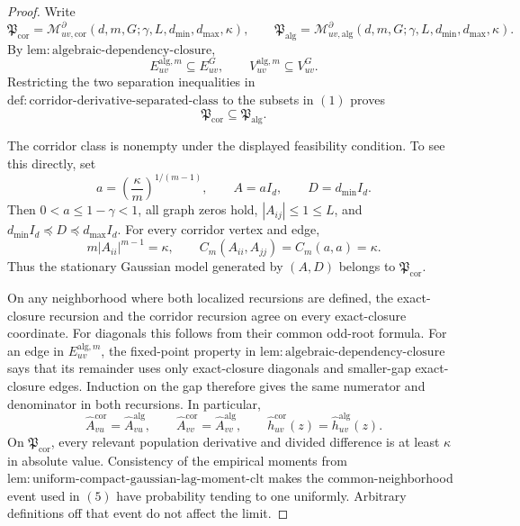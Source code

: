 \documentclass{article}
\begin{document}
\begin{proof}
Write
\[
 \mathfrak P_{\mathrm{cor}}
 =\mathcal M_{uv,\mathrm{cor}}^{\partial}
 (d,m,G;\gamma,L,d_{\min},d_{\max},\kappa),
 \qquad
 \mathfrak P_{\mathrm{alg}}
 =\mathcal M_{uv,\mathrm{alg}}^{\partial}
 (d,m,G;\gamma,L,d_{\min},d_{\max},\kappa).
\]
By \(\mathrm{lem{:}algebraic\mbox{-}dependency\mbox{-}closure}\),
\[
 E_{uv}^{\mathrm{alg},m}\subseteq E_{uv}^{G},
 \qquad
 V_{uv}^{\mathrm{alg},m}\subseteq V_{uv}^{G}.
\tag{1}
\]
Restricting the two separation inequalities in \(\mathrm{def{:}corridor\mbox{-}derivative\mbox{-}separated\mbox{-}class}\) to the subsets in \((1)\) proves
\[
 \mathfrak P_{\mathrm{cor}}\subseteq\mathfrak P_{\mathrm{alg}}.
\tag{2}
\]

The corridor class is nonempty under the displayed feasibility condition.  To see this directly, set
\[
 a=\left(\frac{\kappa}{m}\right)^{1/(m-1)},
 \qquad A=aI_d,
 \qquad D=d_{\min}I_d.
\tag{3}
\]
Then \(0<a\le1-\gamma<1\), all graph zeros hold, \(|A_{ij}|\le1\le L\), and
\(d_{\min}I_d\preceq D\preceq d_{\max}I_d\).  For every corridor vertex and edge,
\[
 m|A_{ii}|^{m-1}=\kappa,
 \qquad
 C_m(A_{ii},A_{jj})=C_m(a,a)=\kappa.
\tag{4}
\]
Thus the stationary Gaussian model generated by \((A,D)\) belongs to \(\mathfrak P_{\mathrm{cor}}\).

On any neighborhood where both localized recursions are defined, the exact-closure recursion and the corridor recursion agree on every exact-closure coordinate.  For diagonals this follows from their common odd-root formula.  For an edge in \(E_{uv}^{\mathrm{alg},m}\), the fixed-point property in \(\mathrm{lem{:}algebraic\mbox{-}dependency\mbox{-}closure}\) says that its remainder uses only exact-closure diagonals and smaller-gap exact-closure edges.  Induction on the gap therefore gives the same numerator and denominator in both recursions.  In particular,
\[
 \widehat A_{vu}^{\mathrm{cor}}=\widehat A_{vu}^{\mathrm{alg}},
 \qquad
 \widehat A_{vv}^{\mathrm{cor}}=\widehat A_{vv}^{\mathrm{alg}},
 \qquad
 \widehat h_{uv}^{\mathrm{cor}}(z)=\widehat h_{uv}^{\mathrm{alg}}(z).
\tag{5}
\]
On \(\mathfrak P_{\mathrm{cor}}\), every relevant population derivative and divided difference is at least \(\kappa\) in absolute value.  Consistency of the empirical moments from \(\mathrm{lem{:}uniform\mbox{-}compact\mbox{-}gaussian\mbox{-}lag\mbox{-}moment\mbox{-}clt}\) makes the common-neighborhood event used in \((5)\) have probability tending to one uniformly.  Arbitrary definitions off that event do not affect the limit.


\end{proof}
\end{document}
